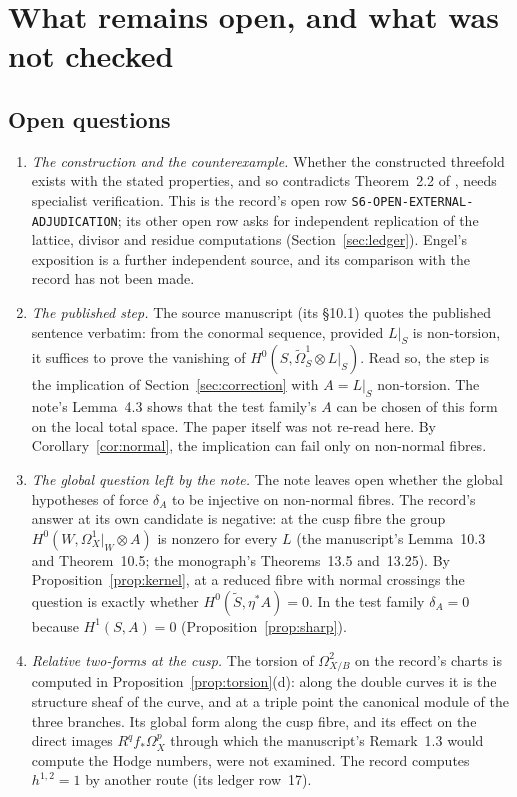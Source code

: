 \section{What remains open, and what was not checked}\label{sec:open}

\subsection{Open questions}

\begin{enumerate}[label=\arabic*.,ref=\arabic*]
\item\label{q:construction} \emph{The construction and the counterexample.} Whether the constructed threefold exists with the stated properties, and so contradicts Theorem~2.2 of \cite{CDP20}, needs specialist verification. This is the record's open row \texttt{S6-OPEN-EXTERNAL-ADJUDICATION}; its other open row asks for independent replication of the lattice, divisor and residue computations (Section~\ref{sec:ledger}). Engel's exposition \cite{EngelS6} is a further independent source, and its comparison with the record has not been made.
\item\label{q:step} \emph{The published step.} The source manuscript (its §10.1) quotes the published sentence verbatim: from the conormal sequence, provided $L|_S$ is non-torsion, it suffices to prove the vanishing of $H^0(S,\widetilde\Omega^1_S\otimes L|_S)$. Read so, the step is the implication of Section~\ref{sec:correction} with $A=L|_S$ non-torsion. The note's Lemma~4.3 shows that the test family's $A$ can be chosen of this form on the local total space. The paper itself was not re-read here. By Corollary~\ref{cor:normal}, the implication can fail only on non-normal fibres.
\item\label{q:global} \emph{The global question left by the note.} The note leaves open whether the global hypotheses of \cite{CDP20} force $\delta_A$ to be injective on non-normal fibres. The record's answer at its own candidate is negative: at the cusp fibre the group $H^0(W,\Omega^1_X|_W\otimes A)$ is nonzero for every $L$ (the manuscript's Lemma~10.3 and Theorem~10.5; the monograph's Theorems~13.5 and~13.25). By Proposition~\ref{prop:kernel}, at a reduced fibre with normal crossings the question is exactly whether $H^0(\tilde S,\eta^*A)=0$. In the test family $\delta_A=0$ because $H^1(S,A)=0$ (Proposition~\ref{prop:sharp}).
\item\label{q:twoforms} \emph{Relative two-forms at the cusp.} The torsion of $\Omega^2_{X/B}$ on the record's charts is computed in Proposition~\ref{prop:torsion}(d): along the double curves it is the structure sheaf of the curve, and at a triple point the canonical module of the three branches. Its global form along the cusp fibre, and its effect on the direct images $R^qf_*\Omega^p_X$ through which the manuscript's Remark~1.3 would compute the Hodge numbers, were not examined. The record computes $h^{1,2}=1$ by another route (its ledger row~17).

\end{enumerate}
